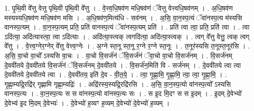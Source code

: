 \documentclass[17pt]{extarticle}
\begin{document}
1. पृ॒थि॒वी वे᳚त्तु वेत्तु पृथि॒वी पृ॑थि॒वी वे᳚त्तु । . वे॒त्त्व॒धि॒षव॑ण मधि॒षव॑णं ॅवेत्तु वेत्त्वधि॒षव॑णम् । . अ॒धि॒षव॑ण मस्यस्यधि॒षव॑ण मधि॒षव॑ण मसि । . अ॒धि॒षव॑ण॒मित्य॑धि - सव॑नम् । . अ॒सि॒ वा॒न॒स्प॒त्यं ॅवा॑नस्प॒त्य म॑स्यसि वानस्प॒त्यम् । . वा॒न॒स्प॒त्यम् प्रति॒ प्रति॑ वानस्प॒त्यं ॅवा॑नस्प॒त्यम् प्रति॑ । . प्रति॑ त्वा त्वा॒ प्रति॒ प्रति॑ त्वा । . त्वा ऽदि॑त्या॒ अदि॑त्यास्त्वा॒ त्वा ऽदि॑त्याः । . अदि॑त्या॒स्त्वक् त्वगदि॑त्या॒ अदि॑त्या॒स्त्वक् । . त्वग् वे᳚त्तु वेत्तु॒ त्वक् त्वग् वे᳚त्तु । . वे॒त्त्व॒ग्नेर॒ग्नेर् वे᳚त्तु वेत्त्व॒ग्नेः । . अ॒ग्ने स्त॒नू स्त॒नू र॒ग्ने र॒ग्ने स्त॒नूः । . त॒नूर॑स्यसि त॒नूस्त॒नूर॑सि । . अ॒सि॒ वा॒चो वा॒चो᳚ ऽस्यसि वा॒चः । . वा॒चो वि॒सर्ज॑नं ॅवि॒सर्ज॑नं ॅवा॒चो वा॒चो वि॒सर्ज॑नम् । . वि॒सर्ज॑नम् दे॒ववी॑तये दे॒ववी॑तये वि॒सर्ज॑नं ॅवि॒सर्ज॑नम् दे॒ववी॑तये । . वि॒सर्ज॑न॒मिति॑ वि - सर्ज॑नम् । . दे॒ववी॑तये त्वा त्वा दे॒ववी॑तये दे॒ववी॑तये त्वा । . दे॒ववी॑तय॒ इति॑ दे॒व - वी॒त॒ये॒ । . त्वा॒ गृ॒ह्णा॒मि॒ गृ॒ह्णा॒मि॒ त्वा॒ त्वा॒ गृ॒ह्णा॒मि॒ । . गृ॒ह्णा॒म्यद्रि॒रद्रि॑र् गृह्णामि गृह्णा॒म्यद्रिः॑ । . अद्रि॑रस्य॒स्यद्रि॒रद्रि॑रसि । . अ॒सि॒ वा॒न॒स्प॒त्यो वा॑नस्प॒त्यो᳚ ऽस्यसि वानस्प॒त्यः । . वा॒न॒स्प॒त्यः स स वा॑नस्प॒त्यो वा॑नस्प॒त्यः सः । . स इ॒द मि॒दꣳ स स इ॒दम् । . इ॒दम् दे॒वेभ्यो॑ दे॒वेभ्य॑ इ॒द मि॒दम् दे॒वेभ्यः॑ । . दे॒वेभ्यो॑ ह॒व्यꣳ ह॒व्यम् दे॒वेभ्यो॑ दे॒वेभ्यो॑ ह॒व्यम् । \newline
\end{document}
